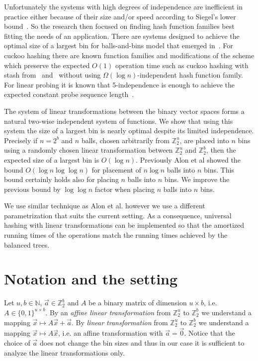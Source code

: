 \documentclass[unicode,review]{siamart1116}
\newcommand{\vecspace}[2]{\mathbb{Z}_{#1}^{#2}}
\newcommand{\binvecspace}[1]{\vecspace{2}{#1}}
\numberwithin{theorem}{section}
\begin{document}
Unfortunately the systems with high degrees of independence are inefficient in practice either because of their size and/or speed according to Siegel's lower bound~\cite{siegel}. 
So the research then focused on finding hash function families best fitting the needs of an application. 
There are systems designed to achieve the optimal size of a largest bin for balls-and-bins model that emerged in~\cite{celisetal}.
For cuckoo hashing there are known function families and modifications of the scheme which preserve the expected $O(1)$ operation time such as cuckoo hashing with stash from~\cite{mitzenmacher-cuckoo} and~\cite{dietzfelbinger-cuckoo} without using $\Omega(\log n)$-independent hash function family.
For linear probing it is known that 5-independence is enough to achieve the expected constant probe sequence length~\cite{linear-probing}.

The system of linear transformations between the binary vector spaces forms a natural two-wise independent system of functions.
We show that using this system the size of a largest bin is nearly optimal despite its limited independence.
 Precisely if $n = 2^b$ and $n$ balls, chosen arbitrarily from $\binvecspace{u}$, are placed into $n$ bins using a randomly chosen linear transformation between $\binvecspace{u}$ and $\binvecspace{b}$, then the expected size of a largest bin is $O(\log n)$.
Previously Alon et al \cite{alonetal} showed the bound $O(\log n \log \log n)$ for placement of $n \log n$ balls into $n$ bins.
This bound certainly holds also for placing $n$ balls into $n$ bins.
We improve the previous bound by $\log \log n$ factor when placing $n$ balls into $n$ bins.

We use similar technique as Alon et al. however we use a different parametrization that suits the current setting. 
As a consequence, universal hashing with linear transformations can be implemented so that the amortized running times of the operations match the running times achieved by the balanced trees.

\section{Notation and the setting}
Let $u, b \in \mathbb{N}$, $\vec{a} \in \binvecspace{b}$ and $A$ be a binary matrix of dimension $u \times b$, i.e. $A \in \{0, 1\}^{u \times b}$.
By an \emph{affine linear transformation} from $\binvecspace{u}$ to $\binvecspace{b}$ we understand a mapping $\vec x \mapsto A\vec x + \vec{a}$.
By \emph{linear transformation} from $\binvecspace{u}$ to $\binvecspace{b}$
we understand a mapping $\vec x \mapsto A\vec x$, i.e. an affine transformation with $\vec{a} = \vec{0}$.
Notice that the choice of $\vec{a}$ does not change the bin sizes and thus in our case it is sufficient to analyze the linear transformations only.
\end{document}
